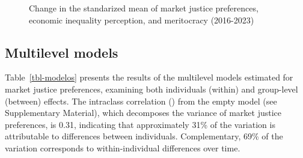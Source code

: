 \documentclass[
  12pt,
]{article}
\begin{document}
\begin{figure}[H]

\caption{\label{fig-meanchange}Change in the standarized mean of market
justice preferences, economic inequality perception, and meritocracy
(2016-2023)}


\end{figure}%

\subsection{Multilevel models}\label{multilevel-models}

Table~\ref{tbl-modelos} presents the results of the multilevel models
estimated for market justice preferences, examining both individuals
(within) and group-level (between) effects. The intraclass correlation
()
from the empty model (see Supplementary Material), which decomposes the
variance of market justice preferences, is 0.31, indicating that
approximately 31\% of the variation is attributable to differences
between individuals. Complementary, 69\% of the variation corresponds to
within-individual differences over time.
\end{document}
